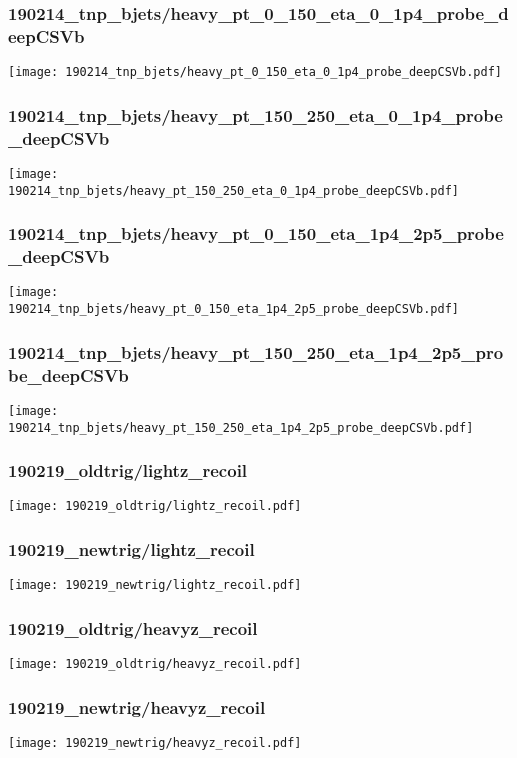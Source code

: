 \begin{frame}
   \frametitle{\small 190214\_tnp\_bjets/heavy\_pt\_0\_150\_eta\_0\_1p4\_probe\_deepCSVb}
   \centering
   \texttt{[image: 190214\_tnp\_bjets/heavy\_pt\_0\_150\_eta\_0\_1p4\_probe\_deepCSVb.pdf]}
\end{frame}

\begin{frame}
   \frametitle{\small 190214\_tnp\_bjets/heavy\_pt\_150\_250\_eta\_0\_1p4\_probe\_deepCSVb}
   \centering
   \texttt{[image: 190214\_tnp\_bjets/heavy\_pt\_150\_250\_eta\_0\_1p4\_probe\_deepCSVb.pdf]}
\end{frame}

\begin{frame}
   \frametitle{\small 190214\_tnp\_bjets/heavy\_pt\_0\_150\_eta\_1p4\_2p5\_probe\_deepCSVb}
   \centering
   \texttt{[image: 190214\_tnp\_bjets/heavy\_pt\_0\_150\_eta\_1p4\_2p5\_probe\_deepCSVb.pdf]}
\end{frame}

\begin{frame}
   \frametitle{\small 190214\_tnp\_bjets/heavy\_pt\_150\_250\_eta\_1p4\_2p5\_probe\_deepCSVb}
   \centering
   \texttt{[image: 190214\_tnp\_bjets/heavy\_pt\_150\_250\_eta\_1p4\_2p5\_probe\_deepCSVb.pdf]}
\end{frame}

\begin{frame}
   \frametitle{\small 190219\_oldtrig/lightz\_recoil}
   \centering
   \texttt{[image: 190219\_oldtrig/lightz\_recoil.pdf]}
\end{frame}

\begin{frame}
   \frametitle{\small 190219\_newtrig/lightz\_recoil}
   \centering
   \texttt{[image: 190219\_newtrig/lightz\_recoil.pdf]}
\end{frame}

\begin{frame}
   \frametitle{\small 190219\_oldtrig/heavyz\_recoil}
   \centering
   \texttt{[image: 190219\_oldtrig/heavyz\_recoil.pdf]}
\end{frame}

\begin{frame}
   \frametitle{\small 190219\_newtrig/heavyz\_recoil}
   \centering
   \texttt{[image: 190219\_newtrig/heavyz\_recoil.pdf]}
\end{frame}

